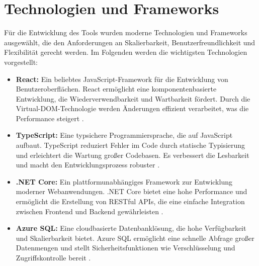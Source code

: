 \section{Technologien und Frameworks}
Für die Entwicklung des Tools wurden moderne Technologien und Frameworks ausgewählt, die den Anforderungen an Skalierbarkeit, Benutzerfreundlichkeit und Flexibilität gerecht werden. Im Folgenden werden die wichtigsten Technologien vorgestellt:

\begin{itemize}
    \item \textbf{React:} Ein beliebtes JavaScript-Framework für die Entwicklung von Benutzeroberflächen. React ermöglicht eine komponentenbasierte Entwicklung, die Wiederverwendbarkeit und Wartbarkeit fördert. Durch die Virtual-DOM-Technologie werden Änderungen effizient verarbeitet, was die Performance steigert \cite{stefanov2021react}.
    \item \textbf{TypeScript:} Eine typsichere Programmiersprache, die auf JavaScript aufbaut. TypeScript reduziert Fehler im Code durch statische Typisierung und erleichtert die Wartung großer Codebasen. Es verbessert die Lesbarkeit und macht den Entwicklungsprozess robuster \cite{typeScriptDocumentation}.
    \item \textbf{.NET Core:} Ein plattformunabhängiges Framework zur Entwicklung moderner Webanwendungen. .NET Core bietet eine hohe Performance und ermöglicht die Erstellung von RESTful APIs, die eine einfache Integration zwischen Frontend und Backend gewährleisten \cite{microsoftDotNet}.
    \item \textbf{Azure SQL:} Eine cloudbasierte Datenbanklösung, die hohe Verfügbarkeit und Skalierbarkeit bietet. Azure SQL ermöglicht eine schnelle Abfrage großer Datenmengen und stellt Sicherheitsfunktionen wie Verschlüsselung und Zugriffskontrolle bereit \cite{azureDocumentation}.
\end{itemize}

